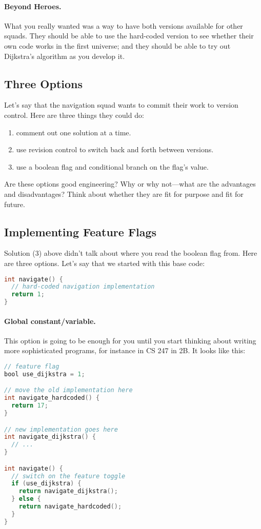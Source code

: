 \documentclass[11pt]{article}
\begin{document}
\paragraph{Beyond Heroes.}
What you really wanted was a way to have both versions available for
other squads. They should be able to use the hard-coded version to see
whether their own code works in the first universe; and they should be
able to try out Dijkstra's algorithm as you develop it.

\subsection*{Three Options}
Let's say that the navigation squad wants to commit their work
to version control. Here are three things they could do:
\begin{enumerate}
\item comment out one solution at a time.
\item use revision control to switch back and forth between versions.
\item use a boolean flag and conditional branch on the flag's value.
\end{enumerate}
Are these options good engineering? Why or why not---what are the
advantages and disadvantages? Think about whether they are fit for
purpose and fit for future.

\subsection*{Implementing Feature Flags}
Solution (3) above didn't talk about where you read the boolean flag
from. Here are three options. Let's say that we
started with this base code:

\begin{lstlisting}[language=C]
int navigate() {
  // hard-coded navigation implementation
  return 1;
}
\end{lstlisting}

\paragraph{Global constant/variable.}
This option is going to be enough for you until you start thinking
about writing more sophisticated programs, for instance in CS 247 in 2B.
It looks like this:
\begin{lstlisting}[language=C]
// feature flag
bool use_dijkstra = 1;

// move the old implementation here
int navigate_hardcoded() {
  return 17;
}

// new implementation goes here
int navigate_dijkstra() {
  // ...
}

int navigate() {
  // switch on the feature toggle
  if (use_dijkstra) {
    return navigate_dijkstra();
  } else {
    return navigate_hardcoded();
  }
}
\end{lstlisting}
\end{document}
